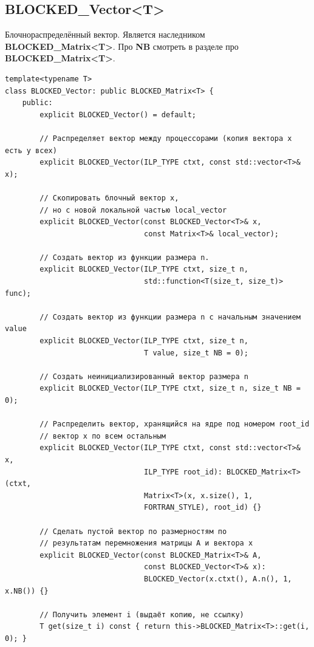 \documentclass[12pt,fleqn]{article}
\begin{document}
        \subsection{\textbf{BLOCKED\_Vector<T>}}
        Блочнораспределённый вектор. Является наследником \textbf{BLOCKED\_Matrix<T>}. Про \textbf{NB} смотреть в разделе про \textbf{BLOCKED\_Matrix<T>}.
\begin{mdframed}[linecolor=black, topline=true, bottomline=true,
    leftline=false, rightline=false]
\begin{verbatim}
template<typename T>
class BLOCKED_Vector: public BLOCKED_Matrix<T> {
    public:
        explicit BLOCKED_Vector() = default;

        // Распределяет вектор между процессорами (копия вектора x есть у всех)
        explicit BLOCKED_Vector(ILP_TYPE ctxt, const std::vector<T>& x);

        // Скопировать блочный вектор x,
        // но с новой локальной частью local_vector
        explicit BLOCKED_Vector(const BLOCKED_Vector<T>& x, 
                                const Matrix<T>& local_vector);

        // Создать вектор из функции размера n.
        explicit BLOCKED_Vector(ILP_TYPE ctxt, size_t n, 
                                std::function<T(size_t, size_t)> func);

        // Создать вектор из функции размера n с начальным значением value
        explicit BLOCKED_Vector(ILP_TYPE ctxt, size_t n, 
                                T value, size_t NB = 0);

        // Создать неинициализированный вектор размера n
        explicit BLOCKED_Vector(ILP_TYPE ctxt, size_t n, size_t NB = 0);

        // Распределить вектор, хранящийся на ядре под номером root_id
        // вектор x по всем остальным
        explicit BLOCKED_Vector(ILP_TYPE ctxt, const std::vector<T>& x, 
                                ILP_TYPE root_id): BLOCKED_Matrix<T>(ctxt, 
                                Matrix<T>(x, x.size(), 1, 
                                FORTRAN_STYLE), root_id) {}

        // Сделать пустой вектор по размерностям по
        // результатам перемножения матрицы А и вектора x
        explicit BLOCKED_Vector(const BLOCKED_Matrix<T>& A, 
                                const BLOCKED_Vector<T>& x): 
                                BLOCKED_Vector(x.ctxt(), A.n(), 1, x.NB()) {}

        // Получить элемент i (выдаёт копию, не ссылку)
        T get(size_t i) const { return this->BLOCKED_Matrix<T>::get(i, 0); }


\end{verbatim}
\end{mdframed}
\end{document}
